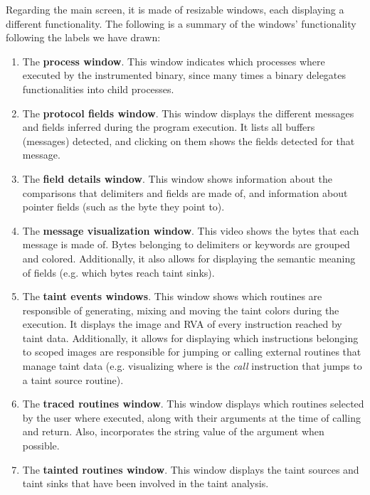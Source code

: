 \documentclass[conference]{IEEEtran}
\begin{document}
Regarding the main screen, it is made of resizable windows, each displaying a
different functionality. The following is a summary of the windows'
functionality following the labels we have drawn:
\begin{enumerate}
    \item The \textbf{process window}. This window indicates which processes where
          executed by the instrumented binary, since many times a binary delegates
          functionalities into child processes.
    \item The \textbf{protocol fields window}. This window displays the different
          messages and fields inferred during the program execution. It lists all buffers
          (messages) detected, and clicking on them shows the fields detected for that
          message.
    \item The \textbf{field details window}. This window shows information about the
          comparisons that delimiters and fields are made of, and information about
          pointer fields (such as the byte they point to).
    \item The \textbf{message visualization window}. This video shows the bytes that each
          message is made of. Bytes belonging to delimiters or keywords are grouped and
          colored. Additionally, it also allows for displaying the semantic meaning of
          fields (e.g. which bytes reach taint sinks).
    \item The \textbf{taint events windows}. This window shows which routines are
          responsible of generating, mixing and moving the taint colors during the
          execution. It displays the image and RVA of every instruction reached by taint
          data. Additionally, it allows for displaying which instructions belonging to
          scoped images are responsible for jumping or calling external routines that
          manage taint data (e.g. visualizing where is the \textit{call} instruction that
          jumps to a taint source routine).
    \item The \textbf{traced routines window}. This window displays which routines
          selected by the user where executed, along with their arguments at the time of
          calling and return. Also, incorporates the string value of the argument when
          possible.
    \item The \textbf{tainted routines window}. This window displays the taint sources
          and taint sinks that have been involved in the taint analysis.
\end{enumerate}
\end{document}
